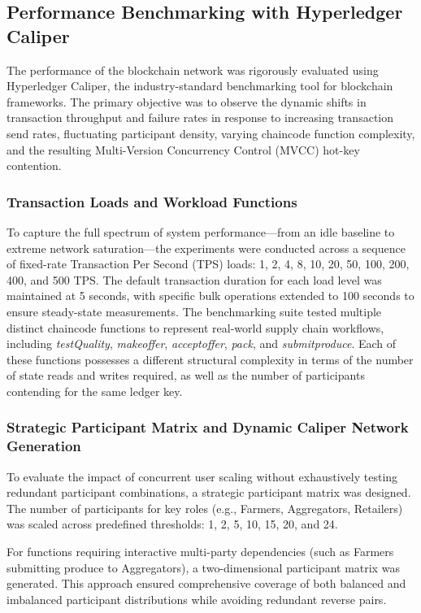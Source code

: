 \documentclass[manuscript,screen,nofonts]{acmart}
\begin{document}
\subsection{Performance Benchmarking with Hyperledger Caliper}

The performance of the blockchain network was rigorously evaluated using Hyperledger Caliper, the industry-standard benchmarking tool for blockchain frameworks. The primary objective was to observe the dynamic shifts in transaction throughput and failure rates in response to increasing transaction send rates, fluctuating participant density, varying chaincode function complexity, and the resulting Multi-Version Concurrency Control (MVCC) hot-key contention.

\subsubsection{Transaction Loads and Workload Functions}

To capture the full spectrum of system performance—from an idle baseline to extreme network saturation—the experiments were conducted across a sequence of fixed-rate Transaction Per Second (TPS) loads: 1, 2, 4, 8, 10, 20, 50, 100, 200, 400, and 500 TPS. The default transaction duration for each load level was maintained at 5 seconds, with specific bulk operations extended to 100 seconds to ensure steady-state measurements. The benchmarking suite tested multiple distinct chaincode functions to represent real-world supply chain workflows, including \textit{testQuality}, \textit{makeoffer}, \textit{acceptoffer}, \textit{pack}, and \textit{submitproduce}. Each of these functions possesses a different structural complexity in terms of the number of state reads and writes required, as well as the number of participants contending for the same ledger key.

\subsubsection{Strategic Participant Matrix and Dynamic Caliper Network Generation}

To evaluate the impact of concurrent user scaling without exhaustively testing redundant participant combinations, a strategic participant matrix was designed. The number of participants for key roles (e.g., Farmers, Aggregators, Retailers) was scaled across predefined thresholds: 1, 2, 5, 10, 15, 20, and 24. 

For functions requiring interactive multi-party dependencies (such as Farmers submitting produce to Aggregators), a two-dimensional participant matrix was generated. This approach ensured comprehensive coverage of both balanced and imbalanced participant distributions while avoiding redundant reverse pairs.
\end{document}
